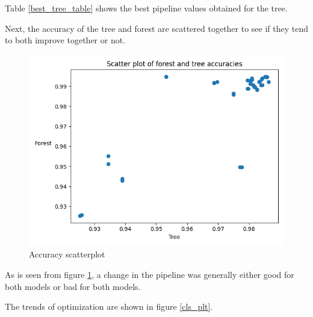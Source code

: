 \documentclass[12pt, letterpaper]{article}
\begin{document}
Table \ref{best_tree_table} shows the best pipeline values obtained for the tree.

\begin{table}[H]
\centering
\caption{Best pipeline values for the tree}
\label{best_tree_table}
\end{table}

Next, the accuracy of the tree and forest are scattered together to see if they tend to both improve together or not.

\begin{figure}[H]
    \centering
    \includegraphics[scale=0.7]{accuracy_scatterplot.png}
    \caption{Accuracy scatterplot}
    \label{acc_plt} %
\end{figure}

As is seen from figure \ref{acc_plt}, a change in the pipeline was generally either good for both models or bad for both models.

The trends of optimization are shown in figure \ref{cls_plt}.
\end{document}
